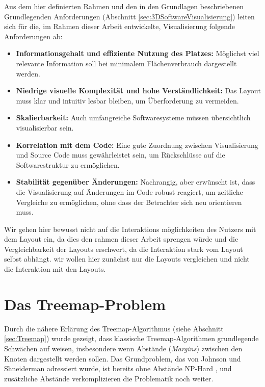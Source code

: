 
\smallskip

Aus dem hier definierten Rahmen und den in den Grundlagen beschriebenen Grundlegenden Anforderungen (Abschnitt \ref{sec:3DSoftwareVisualisierung}) leiten sich für die, im Rahmen dieser Arbeit entwickelte, Visualisierung folgende Anforderungen ab:

\begin{itemize}
    \item \textbf{Informationsgehalt und effiziente Nutzung des Platzes:} Möglichst viel relevante Information soll bei minimalem Flächenverbrauch dargestellt werden.
    \item \textbf{Niedrige visuelle Komplexität und hohe Verständlichkeit:} Das Layout muss klar und intuitiv lesbar bleiben, um Überforderung zu vermeiden.
    \item \textbf{Skalierbarkeit:} Auch umfangreiche Softwaresysteme müssen übersichtlich visualisierbar sein.
    \item \textbf{Korrelation mit dem Code:} Eine gute Zuordnung zwischen Visualisierung und Source Code muss gewährleistet sein, um Rückschlüsse auf die Softwarestruktur zu ermöglichen.
    \item \textbf{Stabilität gegenüber Änderungen:} Nachrangig, aber erwünscht ist, dass die Visualisierung auf Änderungen im Code robust reagiert, um zeitliche Vergleiche zu ermöglichen, ohne dass der Betrachter sich neu orientieren muss.
\end{itemize}

Wir gehen hier bewusst nicht auf die Interaktions möglichkeiten des Nutzers mit dem Layout ein, da dies den rahmen dieser Arbeit sprengen würde und die Vergleichbarkeit der Layouts erschwert, da die Interaktion stark vom Layout selbst abhängt. wir wollen hier zunächst nur die Layouts vergleichen und nicht die Interaktion mit den Layouts.

\section{Das Treemap-Problem} \label{sec:TreemapProblem}

Durch die nähere Erlärung des Treemap-Algorithmus (siehe Abschnitt \ref{sec:Treemap}) wurde gezeigt, dass klassische Treemap-Algorithmen grundlegende Schwächen auf weisen, insbesondere wenn Abstände (\textit{Margins}) zwischen den Knoten dargestellt werden sollen. Das Grundproblem, das von Johnson und Shneiderman \cite{johnson1991tree} adressiert wurde, ist bereits ohne Abstände NP-Hard \cite[3]{bruls2000squarified}, und zusätzliche Abstände verkomplizieren die Problematik noch weiter.

